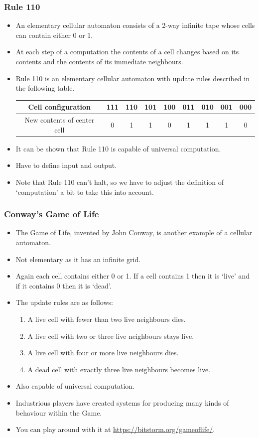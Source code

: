 \documentclass[handout]{beamer}
\begin{document}
\begin{frame}
\frametitle{Rule 110}
\begin{itemize}
\item An elementary cellular automaton consists of a 2-way infinite tape whose cells can contain either 0 or 1. 
\item At each step of a computation the contents of a cell changes based on its contents and the contents of its immediate neighbours. 
\item Rule 110 is an elementary cellular automaton with update rules described in the following table.
\begin{center}
\tiny
\begin{tabular}{| c |c |c |c |c |c |c |c |c|}
\hline
 Cell configuration          & 111 & 110 & 101 & 100 & 011 & 010 & 001 & 000 \\\hline 
 New contents of center cell &  0  &  1  &  1  &  0  &  1  &  1  &  1  &  0\\ \hline   
\end{tabular}
\end{center}

\item It can be shown that Rule 110 is capable of universal computation.
\item Have to define input and output. 
\item Note that Rule 110 can't halt, so we have to adjust the definition of `computation' a bit to take this into account.
\end{itemize} 
\end{frame}

\begin{frame}
\frametitle{Conway's Game of Life}
\begin{itemize}
\item The Game of Life, invented by John Conway, is another example of a cellular automaton.
\item Not elementary as it has an infinite grid. 
\item Again each cell contains either 0 or 1. If a cell contains 1 then it is `live' and if it contains 0 then it is `dead'. 
\item The update rules are as follows:
\begin{enumerate}
\item A live cell with fewer than two live neighbours dies.
\item A live cell with two or three live neighbours stays live.
\item A live cell with four or more live neighbours dies.
\item A dead cell with exactly three live neighbours becomes live. 
\end{enumerate}

\item Also capable of universal computation.
\item Industrious players have created systems for producing many kinds of behaviour within the Game. 
\item You can play around with it at \url{https://bitstorm.org/gameoflife/}.
\end{itemize}
\end{frame}
\end{document}
